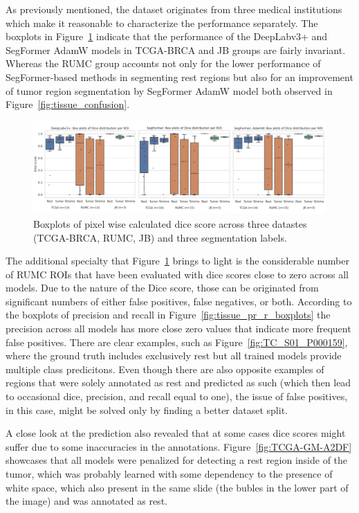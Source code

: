 As previously mentioned, the dataset originates from three medical
institutions which make it reasonable to characterize the performance separately.
The boxplots in Figure~\ref*{fig:tissue_dice_boxplots} indicate that the performance of
the DeepLabv3+ and SegFormer AdamW models in TCGA-BRCA and JB groups are fairly invariant.
Whereas the RUMC group accounts not only for the lower performance of SegFormer-based methods
in segmenting rest regions but also for an improvement of tumor region segmentation by SegFormer AdamW
model both observed in Figure~\ref*{fig:tissue_confusion}.

\begin{figure}[H]
    \includegraphics[width=\linewidth]{figures/tissue/dices.png}
    \caption{Boxplots of pixel wise calculated dice score across three datastes (TCGA-BRCA, RUMC, JB) and three segmentation labels.}
    \label{fig:tissue_dice_boxplots}
\end{figure} 

The additional specialty that Figure~\ref*{fig:tissue_dice_boxplots} brings to light is
the considerable number of RUMC ROIs that have been evaluated with dice scores close to
zero across all models. Due to the nature of the Dice score, those can be originated from
significant numbers of either false positives, false negatives, or both.
According to the boxplots of precision and recall in Figure~\ref*{fig:tissue_pr_r_boxplots}
the precision across all models has more close zero values that indicate more frequent
false positives. There are clear examples, such as Figure~\ref*{fig:TC_S01_P000159},
where the ground truth includes exclusively rest but all trained models provide multiple class predicitons.
Even though there are also opposite examples of regions that were solely annotated as rest and predicted as
such (which then lead to occasional dice, precision, and recall equal to one),
the issue of false positives, in this case, might be solved only by finding a
better dataset split. 

A close look at the prediction also revealed that at some cases dice scores might suffer due to some inaccuracies
in the annotations. Figure~\ref*{fig:TCGA-GM-A2DF} showcases that all models were
penalized for detecting a rest region inside of the tumor, which was probably learned
with some dependency to the presence of white space, which also present in the same slide
(the bubles in the lower part of the image) and was annotated as rest.

